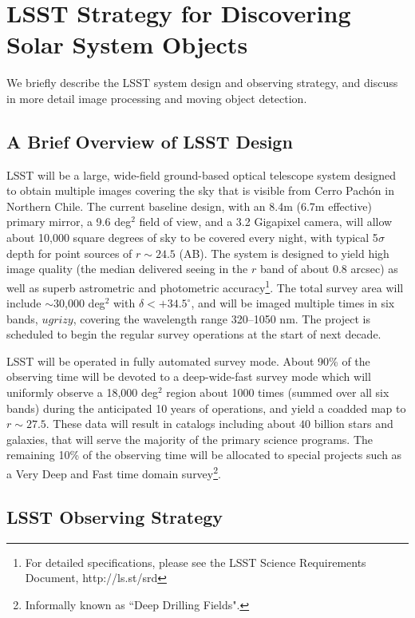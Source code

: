 \section{LSST Strategy for Discovering Solar System Objects} 

We briefly describe the LSST system design and observing strategy, and discuss in more
detail image processing and moving object detection. 

\subsection{A Brief Overview of LSST  Design} 

LSST will be a large, wide-field ground-based optical telescope system
designed to obtain multiple images covering the sky that is visible
from Cerro Pach\'{o}n in Northern Chile. The current baseline design,
with an 8.4m (6.7m effective) primary mirror, a 9.6 deg$^2$ field of
view, and a 3.2 Gigapixel camera, will allow about 10,000 square
degrees of sky to be covered every night, with typical 5$\sigma$ depth 
for point sources of $r\sim24.5$ (AB). The system is designed to yield 
high image quality (the median delivered seeing in the $r$ band of 
about 0.8 arcsec) as well as superb astrometric  and photometric 
accuracy\footnote{For detailed specifications, please see the LSST
Science Requirements Document, http://ls.st/srd}. The total survey
area will include $\sim$30,000 deg$^2$ with $\delta<+34.5^\circ$, and 
will be imaged multiple times in six bands, $ugrizy$, covering the 
wavelength range 320--1050 nm. The project is scheduled to  begin the 
regular survey operations at the start of next decade. 

LSST will be operated in fully automated survey mode. About 90\% of the 
observing time will be devoted to a deep-wide-fast survey mode which will 
uniformly observe a 18,000 deg$^2$ region about 1000 times (summed over 
all six bands) during the anticipated 10 years of operations, and yield a coadded map 
to $r\sim27.5$. These data will result in catalogs including about
$40$ billion stars and galaxies, that will serve the majority of the
primary science programs. The remaining 10\% of the observing time
will be allocated to special projects such as a Very Deep and Fast
time domain survey\footnote{Informally known as ``Deep Drilling Fields".}.



\subsection{LSST Observing Strategy} 

